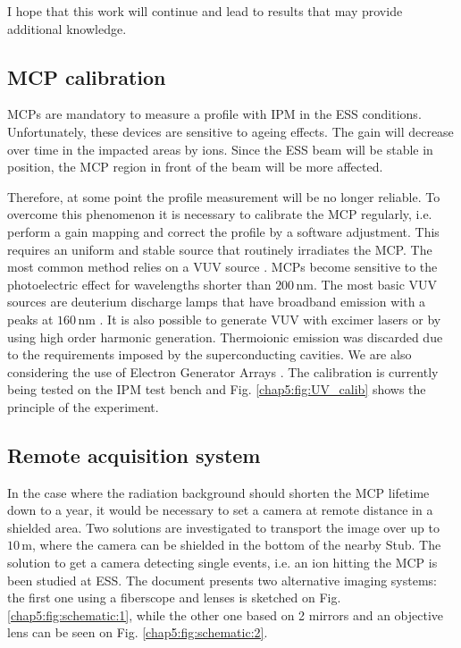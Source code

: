 I hope that this work will continue and lead to results that may provide additional knowledge.




\subsection*{MCP calibration}


MCPs are mandatory to measure a profile with IPM in the ESS conditions. Unfortunately, these devices are sensitive to ageing effects. The gain will decrease over  time in the impacted areas by ions. Since the ESS beam will be stable in position, the MCP region in front of the beam will be more affected.

Therefore, at some point the profile measurement will be no longer reliable. To overcome this phenomenon it is necessary to calibrate the MCP regularly, i.e. perform a gain mapping and correct the profile by a software adjustment. This requires an uniform and stable source that routinely irradiates the MCP. The most common method relies on a VUV source \cite{Giacomini2011}. MCPs become sensitive to the photoelectric effect for wavelengths shorter than $200\,\mathrm{nm}$. The most basic VUV sources are deuterium discharge lamps that have broadband emission with a peaks at $160\,\mathrm{nm}$ \cite{HamamatsuUV,NewportUV}. It is also possible to generate VUV with excimer lasers or by using high order harmonic generation. Thermoionic emission was discarded due to the requirements imposed by the superconducting cavities. We are also considering the use of Electron Generator Arrays \cite{Satou2006, PhotonisEGA}. The calibration is currently being tested on the IPM test bench and Fig. \ref{chap5:fig:UV_calib} shows the principle of the experiment.

\subsection*{Remote acquisition system}

In the case where the radiation background should shorten the MCP lifetime down to a year, it would be necessary to set a camera at remote distance in a shielded area. Two solutions are investigated to transport the image over up to $10\,\mathrm{m}$, where the camera can be shielded in the bottom of the nearby Stub. The solution to get a camera detecting single events, i.e. an ion hitting the MCP is been studied at ESS. The document presents two alternative imaging systems: the first one using a fiberscope and lenses is sketched on Fig. \ref{chap5:fig:schematic:1}, while the other one based on 2 mirrors and an objective lens can be seen on Fig. \ref{chap5:fig:schematic:2}.

